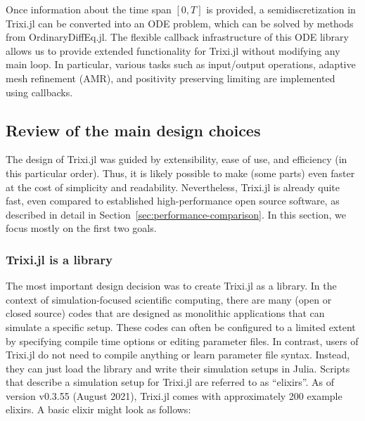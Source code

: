 \documentclass[hidelinks]{juliacon} %
\newcommand{\trixi}{Trixi.jl\xspace}
\begin{document}
Once information about the time span $[0, T]$ is provided, a semidiscretization
in \trixi can be converted into an ODE problem, which can be solved by methods
from OrdinaryDiffEq.jl. The flexible callback infrastructure of this ODE library
allows us to provide extended functionality for \trixi without modifying any
main loop. In particular, various tasks such as input/output operations, adaptive
mesh refinement (AMR), and positivity preserving limiting are implemented using
callbacks.


\subsection{Review of the main design choices}

The design of \trixi was guided by extensibility, ease of use, and efficiency
(in this particular order). Thus, it is likely possible to make (some parts) even
faster at the cost of simplicity and readability. Nevertheless, \trixi is already quite
fast, even compared to established high-performance open source software,
as described in detail in Section~\ref{sec:performance-comparison}. In this
section, we focus mostly on the first two goals.

\subsubsection{\trixi is a library}

The most important design decision was to create \trixi as a library. In the
context of simulation-focused scientific computing, there are many (open
or closed source) codes that are designed as monolithic applications that can
simulate a specific setup. These codes can often be configured to a limited extent
by specifying compile time options or editing parameter files. In contrast, users of
\trixi do not need to compile anything or learn parameter file syntax. Instead, they can
just load the library and write their simulation setups in Julia. Scripts that describe
a simulation setup for \trixi are referred to as ``elixirs''. As of version
v0.3.55 (August 2021), \trixi comes with approximately 200 example elixirs. A basic elixir
might look as follows:
\end{document}
